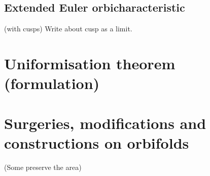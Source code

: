 \subsection{Extended Euler orbicharacteristic}\label{extended_Euler_orbicharacteristic} (with cusps)
Write about cusp as a limit.
\section{Uniformisation theorem (formulation)}
\section{Surgeries, modifications and constructions on orbifolds}
(Some preserve the area)





